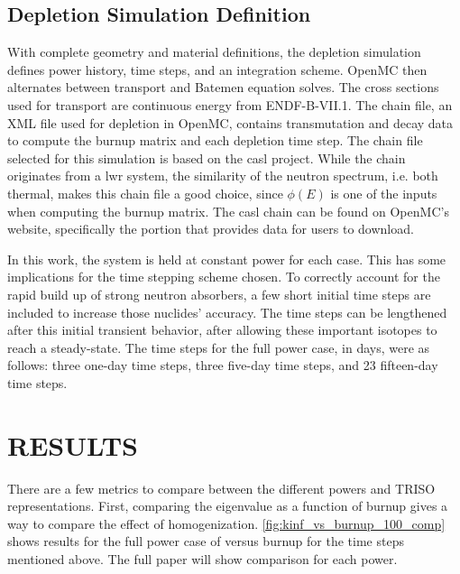 \documentclass[letterpaper]{physor2024}
\begin{document}
\subsection{Depletion Simulation Definition}\label{sec:depl_sim}
With complete geometry and material definitions, the depletion simulation defines power history, time steps, and an integration scheme. OpenMC then alternates between transport and Batemen equation solves. The cross sections used for transport are continuous energy from ENDF-B-VII.1. The chain file, an XML file used for depletion in OpenMC, contains transmutation and decay data to compute the burnup matrix and each depletion time step. The chain file selected for this simulation is based on the \gls{casl} project. While the chain originates from a \gls{lwr} system, the similarity of the neutron spectrum, i.e. both thermal, makes this chain file a good choice, since $\phi(E)$ is one of the inputs when computing the burnup matrix. The \gls{casl} chain can be found on OpenMC's website, specifically the portion that provides data for users to download.

In this work, the system is held at constant power for each case. This has some implications for the time stepping scheme chosen. To correctly account for the rapid build up of strong neutron absorbers, a few short initial time steps are included to increase those nuclides' accuracy. The time steps can be lengthened after this initial transient behavior, after allowing these important isotopes to reach a steady-state. The time steps for the full power case, in days, were as follows: three one-day time steps, three five-day time steps, and 23 fifteen-day time steps.

\section{RESULTS}\label{sec:results}
There are a few metrics to compare between the different powers and TRISO representations. First, comparing the eigenvalue as a function of burnup gives a way to compare the effect of homogenization.  \cref{fig:kinf_vs_burnup_100_comp} shows results for the full power case of \kinf versus burnup for the time steps mentioned above. The full paper will show comparison for each power.
\end{document}
